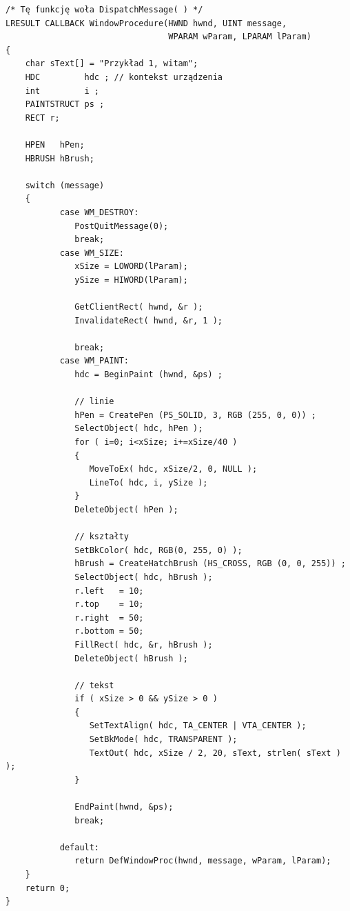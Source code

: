 \begin{scriptsize}
\begin{verbatim}
/* Tę funkcję woła DispatchMessage( ) */
LRESULT CALLBACK WindowProcedure(HWND hwnd, UINT message, 
                                 WPARAM wParam, LPARAM lParam)
{
    char sText[] = "Przykład 1, witam";
    HDC         hdc ; // kontekst urządzenia
    int         i ;
    PAINTSTRUCT ps ;
    RECT r;

    HPEN   hPen;
    HBRUSH hBrush;
    
    switch (message)                  
    {
           case WM_DESTROY:
              PostQuitMessage(0);        
              break;
           case WM_SIZE:
              xSize = LOWORD(lParam); 
              ySize = HIWORD(lParam); 
              
              GetClientRect( hwnd, &r );
              InvalidateRect( hwnd, &r, 1 );
              
              break;   
           case WM_PAINT:
              hdc = BeginPaint (hwnd, &ps) ;
                      
              // linie             
              hPen = CreatePen (PS_SOLID, 3, RGB (255, 0, 0)) ;
              SelectObject( hdc, hPen );              
              for ( i=0; i<xSize; i+=xSize/40 )               
              {
                 MoveToEx( hdc, xSize/2, 0, NULL );
                 LineTo( hdc, i, ySize );
              }   
              DeleteObject( hPen );
          
              // kształty
              SetBkColor( hdc, RGB(0, 255, 0) );
              hBrush = CreateHatchBrush (HS_CROSS, RGB (0, 0, 255)) ;
              SelectObject( hdc, hBrush );
              r.left   = 10;
              r.top    = 10;
              r.right  = 50;
              r.bottom = 50;
              FillRect( hdc, &r, hBrush );              
              DeleteObject( hBrush );

              // tekst
              if ( xSize > 0 && ySize > 0 )
              {
                 SetTextAlign( hdc, TA_CENTER | VTA_CENTER );
                 SetBkMode( hdc, TRANSPARENT );
                 TextOut( hdc, xSize / 2, 20, sText, strlen( sText ) );
              }
          
              EndPaint(hwnd, &ps);
              break;   
              
           default:                   
              return DefWindowProc(hwnd, message, wParam, lParam);
    }
    return 0;
}
\end{verbatim}
\end{scriptsize}


